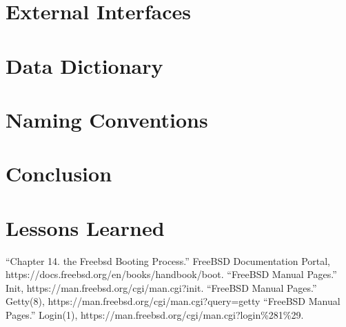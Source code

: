 \documentclass[12pt, dvipsnames, a4paper]{article}
\begin{document}
\section{External Interfaces}
\lipsum[1]

\section{Data Dictionary}
\lipsum[1]

\section{Naming Conventions}
\lipsum[1]

\section{Conclusion}
\lipsum[1]

\section{Lessons Learned}
\lipsum[1]

\begin{thebibliography}{00}
	 “Chapter 14. the Freebsd Booting Process.” FreeBSD Documentation Portal,
	https://docs.freebsd.org/en/books/handbook/boot.
	 “FreeBSD Manual Pages.” Init, https://man.freebsd.org/cgi/man.cgi?init.
	 “FreeBSD Manual Pages.” Getty(8), https://man.freebsd.org/cgi/man.cgi?query=getty
	 “FreeBSD Manual Pages.” Login(1), https://man.freebsd.org/cgi/man.cgi?login\%281\%29.
\end{thebibliography}
\end{document}
